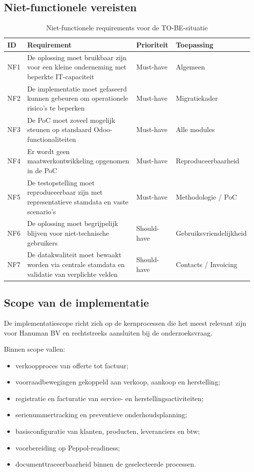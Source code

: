 \subsection{Niet-functionele vereisten}

\begin{table}[H]
\centering
\caption{Niet-functionele requirements voor de TO-BE-situatie}
\label{tab:nietfunctionele-requirements}
\begin{tabular}{|p{1.2cm}|p{6.2cm}|p{2.2cm}|p{3.2cm}|}
\hline
\textbf{ID} & \textbf{Requirement} & \textbf{Prioriteit} & \textbf{Toepassing} \\
\hline
NF1 & De oplossing moet bruikbaar zijn voor een kleine onderneming met beperkte IT-capaciteit & Must-have & Algemeen \\
\hline
NF2 & De implementatie moet gefaseerd kunnen gebeuren om operationele risico's te beperken & Must-have & Migratiekader \\
\hline
NF3 & De PoC moet zoveel mogelijk steunen op standaard Odoo-functionaliteiten & Must-have & Alle modules \\
\hline
NF4 & Er wordt geen maatwerkontwikkeling opgenomen in de PoC & Must-have & Reproduceerbaarheid \\
\hline
NF5 & De testopstelling moet reproduceerbaar zijn met representatieve stamdata en vaste scenario's & Must-have & Methodologie / PoC \\
\hline
NF6 & De oplossing moet begrijpelijk blijven voor niet-technische gebruikers & Should-have & Gebruiksvriendelijkheid \\
\hline
NF7 & De datakwaliteit moet bewaakt worden via centrale stamdata en validatie van verplichte velden & Should-have & Contacts / Invoicing \\
\hline
\end{tabular}
\end{table}

\subsection{Scope van de implementatie}

De implementatiescope richt zich op de kernprocessen die het meest relevant zijn voor Hanuman BV en rechtstreeks aansluiten bij de onderzoeksvraag.

Binnen scope vallen:

\begin{itemize}
    \item verkoopproces van offerte tot factuur;
    \item voorraadbewegingen gekoppeld aan verkoop, aankoop en herstelling;
    \item registratie en facturatie van service- en herstellingsactiviteiten;
    \item serienummertracking en preventieve onderhoudsplanning;
    \item basisconfiguratie van klanten, producten, leveranciers en btw;
    \item voorbereiding op Peppol-readiness;
    \item documenttraceerbaarheid binnen de geselecteerde processen.
\end{itemize}

